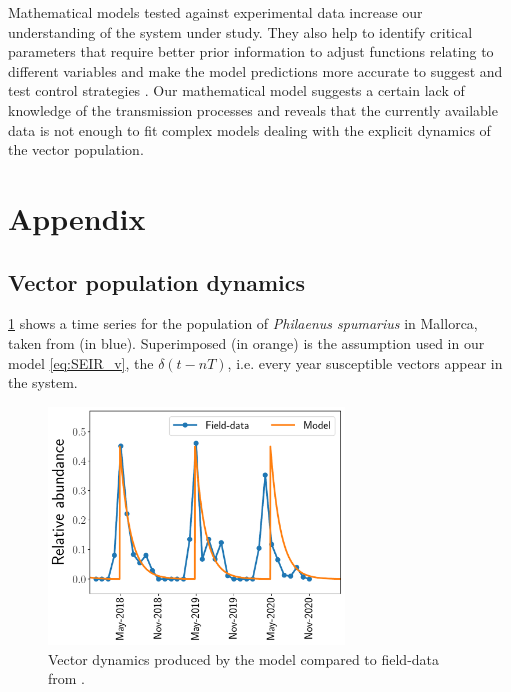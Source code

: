 Mathematical models tested against experimental data increase our understanding
of the system under study. They also help to identify critical
parameters that require better prior information to adjust functions relating
to different variables and make the model predictions more accurate to suggest
and test control strategies \cite{cunniffe2015thirteen, jeger2018plant}. Our
mathematical model suggests a certain lack of knowledge of the transmission
processes and reveals that the currently available data is not enough to fit
complex models dealing with the explicit dynamics of the vector population. \\

\section{Appendix}

\subsection{Vector population dynamics}\label{app:vector_dynamics}

\cref{fig:vector_dynamics} shows a time series for the population of
\textit{Philaenus spumarius} in Mallorca, taken from \cite{Lopez2021} (in
blue). Superimposed (in orange) is the assumption used in our model
\cref{eq:SEIR_v}, the $\delta(t-nT)$, i.e. every year susceptible vectors
appear in the system.

\begin{figure}[H]
    \centering
    \includegraphics[width=0.7\textwidth]{Figures/Vector_dynamics.pdf}
    \caption{Vector dynamics produced by the model compared to field-data
        from \cite{Lopez2021}.}
    \label{fig:vector_dynamics}
\end{figure}

